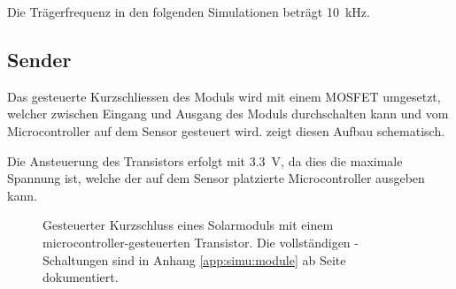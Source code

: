 Die    Tr\"agerfrequenz    in    den    folgenden    Simulationen    betr\"agt
\SI{10}{\kilo\hertz}.


\subsection{Sender}
\label{subsec:simu:ask:sensor}

Das  gesteuerte Kurzschliessen  des Moduls  wird mit  einem MOSFET  umgesetzt,
welcher zwischen  Eingang und  Ausgang des Moduls  durchschalten kann  und vom
Microcontroller auf dem Sensor gesteuert wird. 
zeigt diesen Aufbau schematisch.

Die  Ansteuerung des  Transistors  erfolgt mit  \SI{3.3}{\volt},  da dies  die
maximale Spannung  ist, welche der  auf dem Sensor  platzierte Microcontroller
ausgeben kann.

\begin{figure}[h!tb]
    \centering
    
    \caption{%
        Gesteuerter     Kurzschluss     eines    Solarmoduls     mit     einem
        microcontroller-gesteuerten       Transistor. Die      vollst\"andigen
        -Schaltungen  sind  in Anhang  \ref{app:simu:module}  ab
        Seite \pageref{app:simu:module} dokumentiert.%
    }
    \label{fig:module:mosfet:simple}
\end{figure}

